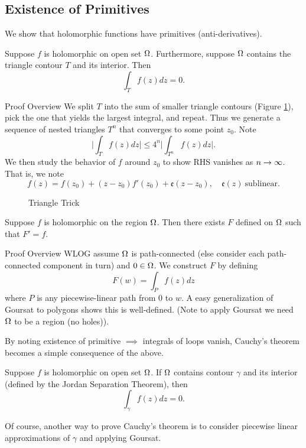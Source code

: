 \subsection{Existence of Primitives}
We show that holomorphic functions have primitives (anti-derivatives).
\begin{lem}[Goursat]
    Suppose $f$ is holomorphic on open set $\Omega$. Furthermore, suppose $\Omega$ contains the triangle contour $T$ and its interior. Then
    \[
        \int_T f(z) dz = 0.
    \]
\end{lem}
\begin{details}{Proof Overview}
    We split $T$ into the sum of smaller triangle contours (Figure \ref{fig:triangle_trick}), pick the one that yields the largest integral, and repeat. Thus we generate a sequence of nested triangles $T^n$ that converges to some point $z_0$. Note
    \[
        \Big| \int_T f(z) dz \Big| \leq 4^n \Big| \int_{T^n} f(z) dz \Big|.
    \]
    We then study the behavior of $f$ around $z_0$ to show RHS vanishes as $n \rightarrow \infty$. That is, we note
    \[
        f(z) = f(z_0) + (z-z_0)f'(z_0) + \mathfrak e(z-z_0), \quad \mathfrak e(z) \ \text{sublinear.}
    \]
\end{details}
\begin{figure}[ht]
    \centering
    \caption{Triangle Trick}
    \label{fig:triangle_trick}
\end{figure}
\begin{thm}
    Suppose $f$ is holomorphic on the region $\Omega$. Then there exists $F$ defined on $\Omega$ such that $F' = f$.
\end{thm}
\begin{details}{Proof Overview}
    WLOG assume $\Omega$ is path-connected (else consider each path-connected component in turn) and $0 \in \Omega$. We construct $F$ by defining
    \[
        F(w) = \int_P f(z)dz
    \]
    where $P$ is any piecewise-linear path from $0$ to $w$. A easy generalization of Goursat to polygons shows this is well-defined. (Note to apply Goursat we need $\Omega$ to be a region (no holes)).
\end{details}

By noting existence of primitive $\implies$ integrals of loops vanish, Cauchy's theorem becomes a simple consequence of the above.
\begin{cor}
    Suppose $f$ is holomorphic on open set $\Omega$. If $\Omega$ contains contour $\gamma$ and its interior (defined by the Jordan Separation Theorem), then
    \[
        \int_\gamma f(z) dz = 0.
    \]
\end{cor}
Of course, another way to prove Cauchy's theorem is to consider piecewise linear approximations of $\gamma$ and applying Goursat.
